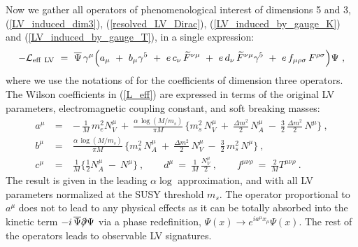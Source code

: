 \documentclass[12pt]{revtex4}
\newcommand{\slashed}[1]{\hbox{{$#1$}\llap{$/$}}}
\begin{document}
Now we gather all operators of phenomenological
interest of dimensions 5 and 3, 
(\ref{LV_induced_dim3}), (\ref{resolved_LV_Dirac}),
(\ref{LV_induced_by_gauge_K}) and
(\ref{LV_induced_by_gauge_T}), in a single expression:
\begin{equation}
\label{L_eff}
 - \mathcal{L}_{\rm eff~LV}
         ~=~ 
\overline{\Psi}\, \gamma^\mu \Big( 
 a_\mu ~+~ b_\mu \gamma^5 
~+~ e\,c_\nu\,   \widetilde{F}^{\nu\mu} 
~+~  e\, d_\nu\,\widetilde{F}^{\nu\mu} \gamma^5
~+~e\, f_{\mu\rho\sigma}\,  F^{\rho\sigma} 
\Big) \Psi~, 
\end{equation} 
%
where we use the notations of \cite{Colladay:1998fq} for the
coefficients of dimension three operators. The Wilson coefficients in
(\ref{L_eff}) are expressed in terms of the original LV parameters,
electromagnetic coupling constant, and soft breaking masses: 
\begin{eqnarray}
\nonumber
        a^\mu & ~=~ &
         -\, \frac{1}{M}\, m_e^2 N_V^\mu 
        ~+~
        \frac{\alpha\, \log (M/m_s)}{\pi M}\, 
        \Big\{
         m_s^2\, N_V^\mu 
                ~+~
                 \frac{\Delta m^2}{2}\, 
                                             N_A^\mu
                ~-~
                \frac{3}{2}\, \frac{\Delta m^2}{2}\, 
                                               N^\mu  
        \Big\}~ ,
\\
\label{L_eff_coefs}
        b^\mu & ~=~ & 
        \frac{\alpha\,\log (M/m_s)}{\pi M} \, 
        \Big\{
                 m_s^2\, N_A^\mu
                ~+~
                 \frac{\Delta m^2}{2}\, 
                                             N_V^\mu
                ~-~
                \frac{3}{2}\, m_s^2\, N^\mu
        \Big\} ~,
\\
\nonumber
        c^\mu & ~=~ &
         \frac{1}{M}
        \Big\{ 
                \frac{1}{2}N_A^\mu
                ~-~
                N^\mu
        \Big\}~,\qquad 
        d^\mu ~=~
        \frac{1}{M}\, \frac{N_V^\mu}{2} 
~,\qquad 
        f^{\mu\nu\rho} ~ = ~
        \frac{2}{M} T^{\mu\nu\rho}
~.
\end{eqnarray}
%
The result is given in the leading $\alpha \log$ approximation, and with
all LV parameters normalized at the SUSY threshold
$m_s$. The operator proportional to $ a^\mu $ does not to lead to 
any physical effects as it can be totally absorbed into
the kinetic term $ - i\, \overline{\Psi}\slashed{\partial}\Psi $
via a phase redefinition, $ \Psi(x) \to e^{i a^\mu x_\mu} \Psi(x) $.
The rest of the operators leads to observable LV signatures. 
\end{document}
